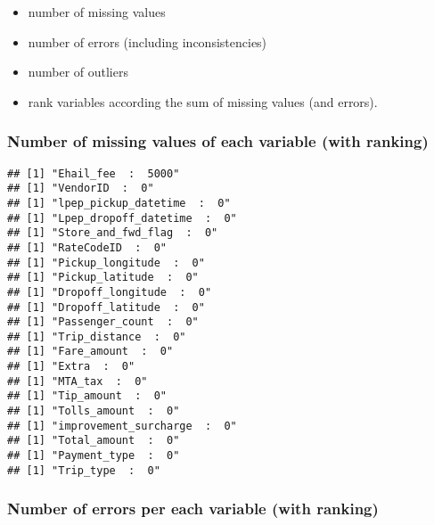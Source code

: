 \documentclass[
  18pt,
  a4paper]{article}
\newenvironment{Shaded}{\begin{snugshade}}{\end{snugshade}}
\newcommand{\ControlFlowTok}[1]{\textcolor[rgb]{0.13,0.29,0.53}{\textbf{#1}}}
\newcommand{\DataTypeTok}[1]{\textcolor[rgb]{0.13,0.29,0.53}{#1}}
\newcommand{\KeywordTok}[1]{\textcolor[rgb]{0.13,0.29,0.53}{\textbf{#1}}}
\newcommand{\NormalTok}[1]{#1}
\newcommand{\OperatorTok}[1]{\textcolor[rgb]{0.81,0.36,0.00}{\textbf{#1}}}
\newcommand{\OtherTok}[1]{\textcolor[rgb]{0.56,0.35,0.01}{#1}}
\newcommand{\StringTok}[1]{\textcolor[rgb]{0.31,0.60,0.02}{#1}}
\providecommand{\tightlist}{%
  \setlength{\itemsep}{0pt}\setlength{\parskip}{0pt}}
\begin{document}
\begin{itemize}
\tightlist
\item
  number of missing values
\item
  number of errors (including inconsistencies)
\item
  number of outliers
\item
  rank variables according the sum of missing values (and errors).
\end{itemize}

\hypertarget{number-of-missing-values-of-each-variable-with-ranking}{%
\subsubsection{Number of missing values of each variable (with
ranking)}\label{number-of-missing-values-of-each-variable-with-ranking}}

\begin{Shaded}
\end{Shaded}

\begin{verbatim}
## [1] "Ehail_fee  :  5000"
## [1] "VendorID  :  0"
## [1] "lpep_pickup_datetime  :  0"
## [1] "Lpep_dropoff_datetime  :  0"
## [1] "Store_and_fwd_flag  :  0"
## [1] "RateCodeID  :  0"
## [1] "Pickup_longitude  :  0"
## [1] "Pickup_latitude  :  0"
## [1] "Dropoff_longitude  :  0"
## [1] "Dropoff_latitude  :  0"
## [1] "Passenger_count  :  0"
## [1] "Trip_distance  :  0"
## [1] "Fare_amount  :  0"
## [1] "Extra  :  0"
## [1] "MTA_tax  :  0"
## [1] "Tip_amount  :  0"
## [1] "Tolls_amount  :  0"
## [1] "improvement_surcharge  :  0"
## [1] "Total_amount  :  0"
## [1] "Payment_type  :  0"
## [1] "Trip_type  :  0"
\end{verbatim}

\hypertarget{number-of-errors-per-each-variable-with-ranking}{%
\subsubsection{Number of errors per each variable (with
ranking)}\label{number-of-errors-per-each-variable-with-ranking}}
\end{document}
